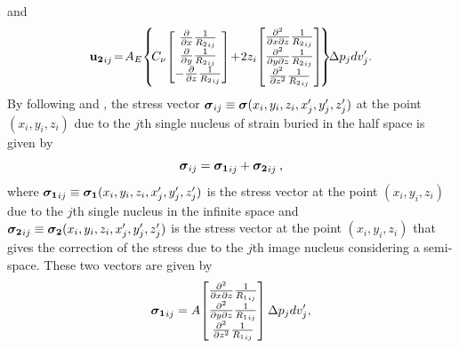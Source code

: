 \documentclass[P]{BrJG_submit}
\begin{document}
and 
\begin{equation}
{\bf{u_{2}}}_{ij} \! = \! 
A_{E} \! \left\{\! C_{\nu} \!
\begin{bmatrix} 
   \frac{\partial}{\partial x} {\frac{1}{{R_2}_{ij}}}  \\
   \frac{\partial}{\partial y} {\frac{1}{{R_2}_{ij}}}  \\
  -\frac{\partial}{\partial z} {\frac{1}{{R_2}_{ij}}}  
\end{bmatrix}
\! + \! 2 z_{i} \!
\begin{bmatrix} 
\frac{\partial^{2}}{\partial x \partial z} {\frac{1}{{R_2}_{ij}}} \\
\frac{\partial^{2}}{\partial y \partial z} {\frac{1}{{R_2}_{ij}}} \\
\frac{\partial^{2}}{\partial z^{2}} {\frac{1}{{R_2}_{ij}}} 
\end{bmatrix} \!
\right\} \! \!
\Delta p_{j} dv_j^{\prime}.
\label{eq:nucleus-u2-vector}
\end{equation}
By following \cite{Sharma56} and \cite{Tempone10}, 
the stress vector 
$\mbox{\boldmath$\sigma$}_{ij} \equiv \mbox{\boldmath$\sigma$}(x_{i}, y_{i}, z_{i}, x^{\prime}_{j}, y^{\prime}_{j}, z^{\prime}_{j})$ 
at the point $(x_{i}, y_{i}, z_{i})$ due to the $j$th single nucleus of strain buried 
in the half space is given by
\begin{equation}
\mbox{\boldmath$\sigma$}_{ij} = \mbox{\boldmath$\sigma_{1}$}_{ij} + 
\mbox{\boldmath$\sigma_{2}$}_{ij} \: ,
\label{eq:stress_nucleus}
\end{equation}
where $\mbox{\boldmath$\sigma_{1}$}_{ij} \equiv \mbox{\boldmath$\sigma_{1}$}(x_{i}, y_{i}, z_{i}, x^{\prime}_{j}, y^{\prime}_{j}, z^{\prime}_{j})$ is the stress vector 
at the point $(x_{i}, y_{i}, z_{i})$ due to the $j$th single nucleus in the infinite space and $\mbox{\boldmath$\sigma_{2}$}_{ij} \equiv \mbox{\boldmath$\sigma_{2}$}(x_{i}, y_{i}, z_{i}, x^{\prime}_{j}, y^{\prime}_{j}, z^{\prime}_{j})$ is the stress vector 
at the point $(x_{i}, y_{i}, z_{i})$ that gives the correction of the stress due to the 
$j$th image nucleus considering a semi-space. These two vectors are given by
\begin{equation}
\mbox{\boldmath$\sigma_{1}$}_{ij} =
A  \! 
\begin{bmatrix} 
\frac{\partial^{2} }{\partial x \partial z} {\frac{1}{{R_1}_{ij}}}  \\
\frac{\partial^{2} }{\partial y \partial z} {\frac{1}{{R_1}_{ij}}}  \\
\frac{\partial^{2} }{\partial z^{2}} {\frac{1}{{R_1}_{ij}}} 
\end{bmatrix}
\Delta p_{j} dv_j^{\prime},
\label{eq:nucleus-stress1-vector}
\end{equation}
\end{document}

